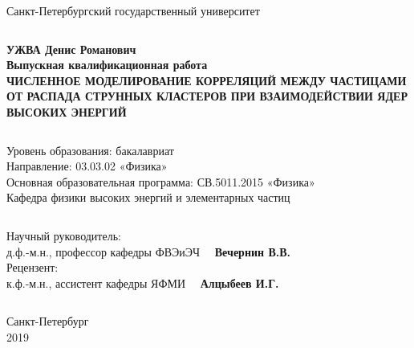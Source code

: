 \documentclass[runningheads,a4paper]{article}
\begin{document}


\begin{center}
\Large{Санкт-Петербургский государственный университет} 
\end{center}
$$$$
$$$$
$$$$
$$$$
$$$$
$$$$


\begin{center}
\Large{{\bf УЖВА Денис Романович}}\\
\vspace{2em}
\Large{{\bf Выпускная квалификационная работа}}\\
\vspace{2em}
\Large{{\bf ЧИСЛЕННОЕ МОДЕЛИРОВАНИЕ КОРРЕЛЯЦИЙ МЕЖДУ ЧАСТИЦАМИ ОТ РАСПАДА СТРУННЫХ КЛАСТЕРОВ ПРИ ВЗАИМОДЕЙСТВИИ ЯДЕР ВЫСОКИХ ЭНЕРГИЙ }}
\end{center}
$$$$
$$$$
$$$$
$$$$


\begin{center}
\Large{ Уровень образования: бакалавриат }\\
\Large{ Направление: 03.03.02 «Физика» }\\
\Large{ Основная образовательная программа: СВ.5011.2015 «Физика» }\\
\vspace{1em}
\Large{ Кафедра физики высоких энергий и элементарных частиц }
\end{center}


$$$$
$$$$
$$$$
$$$$
$$$$
$$$$

\begin{flushright}
$$$$
Научный руководитель: \\
д.ф.-м.н., профессор кафедры ФВЭиЭЧ \ \ {\bf Вечернин В.В.} \\
\vspace{2em}
Рецензент: \\
к.ф.-м.н., ассистент кафедры ЯФМИ \ \ {\bf Алцыбеев И.Г.} \\
\end{flushright}
$$$$

\begin{center}
\Large{
Санкт-Петербург \\
2019}
\end{center}
\end{document}

